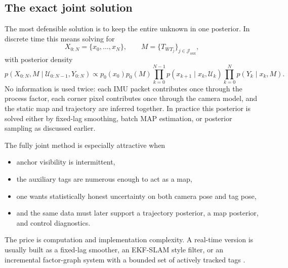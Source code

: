 \documentclass[11pt]{report}
\begin{document}
\subsection{The exact joint solution}
The most defensible solution is to keep the entire unknown in one posterior. In discrete time this means solving for
\[
X_{0:N}=\{x_0,\ldots,x_N\},\qquad M=\{T_{WT_j}\}_{j\in\mathcal J_{\mathrm{aux}}},
\]
with posterior density
\[
p(X_{0:N},M\mid \mathcal U_{0:N-1},Y_{0:N})
\propto
p_0(x_0)p_0(M)
\prod_{k=0}^{N-1} p(x_{k+1}\mid x_k,\mathcal U_k)
\prod_{k=0}^{N} p(Y_k\mid x_k,M).
\]
No information is used twice: each IMU packet contributes once through the process factor, each corner pixel contributes once through the camera model, and the static map and trajectory are inferred together. In practice this posterior is solved either by fixed-lag smoothing, batch MAP estimation, or posterior sampling as discussed earlier.

The fully joint method is especially attractive when
\begin{itemize}
    \item anchor visibility is intermittent,
    \item the auxiliary tags are numerous enough to act as a map,
    \item one wants statistically honest uncertainty on both camera pose and tag pose,
    \item and the same data must later support a trajectory posterior, a map posterior, and control diagnostics.
\end{itemize}
The price is computation and implementation complexity. A real-time version is usually built as a fixed-lag smoother, an EKF-SLAM style filter, or an incremental factor-graph system with a bounded set of actively tracked tags \citep{mourikis2007msckf,leutenegger2015okvis,forster2017preintegration,TagSLAM2019}.
\end{document}
